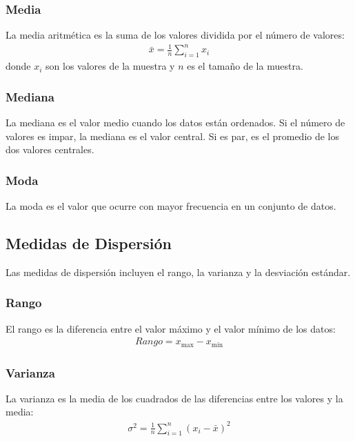 \documentclass[a4paper]{report} %
\begin{document}
\subsubsection{Media}

La media aritm\'etica es la suma de los valores dividida por el n\'umero de valores:
\begin{eqnarray*}
\bar{x} = \frac{1}{n} \sum_{i=1}^{n} x_i
\end{eqnarray*}
donde $x_i$ son los valores de la muestra y $n$ es el tama\~no de la muestra.

\subsubsection{Mediana}

La mediana es el valor medio cuando los datos est\'an ordenados. Si el n\'umero de valores es impar, la mediana es el valor central. Si es par, es el promedio de los dos valores centrales.

\subsubsection{Moda}

La moda es el valor que ocurre con mayor frecuencia en un conjunto de datos.

\subsection{Medidas de Dispersi\'on}

Las medidas de dispersi\'on incluyen el rango, la varianza y la desviaci\'on est\'andar.

\subsubsection{Rango}

El rango es la diferencia entre el valor m\'aximo y el valor m\'inimo de los datos:
\begin{eqnarray*}
Rango = x_{\text{max}} - x_{\text{min}}
\end{eqnarray*}

\subsubsection{Varianza}

La varianza es la media de los cuadrados de las diferencias entre los valores y la media:
\begin{eqnarray*}
\sigma^2 = \frac{1}{n} \sum_{i=1}^{n} (x_i - \bar{x})^2
\end{eqnarray*}
\end{document}
